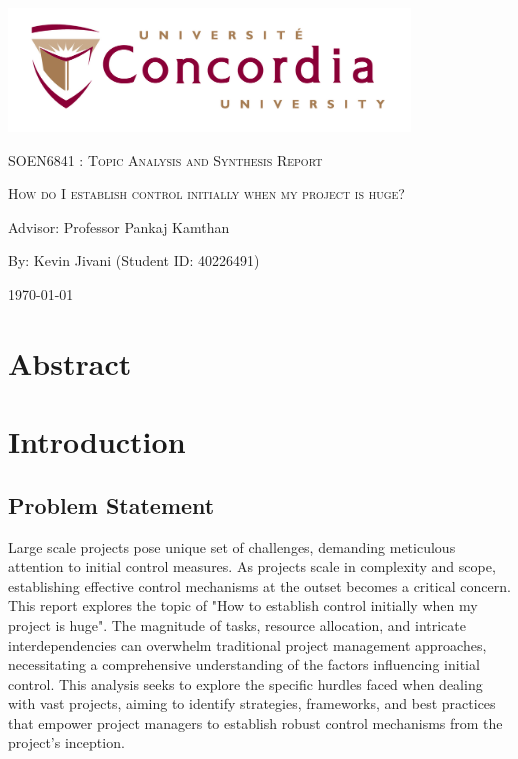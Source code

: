 \documentclass[runningheads]{llncs}
\begin{document}
\begin{titlepage}
    \centering
    \includegraphics[width=0.8\textwidth]{image.jpeg}\par %
     \vspace{2cm}
    {\scshape\large SOEN6841 : Topic Analysis and Synthesis Report \par}
    \vspace{1.5cm}
    {\scshape\Huge How do I establish control initially when my project is huge?\par}
    \vspace{1.5cm}
    \vspace{1.5cm}
    {\large Advisor: Professor Pankaj Kamthan\par}
    \vspace{1.5cm}
    {\large By: Kevin Jivani (Student ID: 40226491)\par}
    \vspace{1cm}
    {\large \today\par}
\end{titlepage}

\setcounter{tocdepth}{2}
\tableofcontents
\newpage


\section*{Abstract}
\newpage

\section{Introduction}


\subsection{Problem Statement}
Large scale projects pose unique set of challenges, demanding meticulous attention to initial control measures. As projects scale in complexity and scope, establishing effective control mechanisms at the outset becomes a critical concern. This report explores the topic of "How to establish control initially when my project is huge". The magnitude of tasks, resource allocation, and intricate interdependencies can overwhelm traditional project management approaches, necessitating a comprehensive understanding of the factors influencing initial control. This analysis seeks to explore the specific hurdles faced when dealing with vast projects, aiming to identify strategies, frameworks, and best practices that empower project managers to establish robust control mechanisms from the project's inception.
\end{document}

